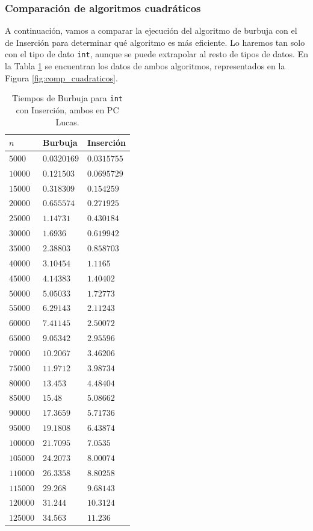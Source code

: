 \documentclass[12pt]{article}
\begin{document}
    \subsubsection{Comparación de algoritmos cuadráticos}
    A continuación, vamos a comparar la ejecución del algoritmo de burbuja con el de Inserción para determinar qué algoritmo es más eficiente. Lo haremos tan solo con el tipo de dato \verb|int|, aunque se puede extrapolar al resto de tipos de datos. En la Tabla \ref{tab:comp_cuadraticos} se encuentran los datos de ambos algoritmos, representados en la Figura \ref{fig:comp_cuadraticos}.
    \begin{table}
        \centering
        \begin{tabular}{|l|l|l|}
            \hline
            $n$ & Burbuja & Inserción \\
            \hline
            $5000$ & $0.0320169$ & $0.0315755$ \\
            $10000$ & $0.121503$ & $0.0695729$ \\
            $15000$ & $0.318309$ & $0.154259$ \\
            $20000$ & $0.655574$ & $0.271925$ \\
            $25000$ & $1.14731$ & $0.430184$ \\
            $30000$ & $1.6936$ & $0.619942$ \\
            $35000$ & $2.38803$ & $0.858703$ \\
            $40000$ & $3.10454$ & $1.1165$ \\
            $45000$ & $4.14383$ & $1.40402$ \\
            $50000$ & $5.05033$ & $1.72773$ \\
            $55000$ & $6.29143$ & $2.11243$ \\
            $60000$ & $7.41145$ & $2.50072$ \\
            $65000$ & $9.05342$ & $2.95596$ \\
            $70000$ & $10.2067$ & $3.46206$ \\
            $75000$ & $11.9712$ & $3.98734$ \\
            $80000$ & $13.453$ & $4.48404$ \\
            $85000$ & $15.48$ & $5.08662$ \\
            $90000$ & $17.3659$ & $5.71736$ \\
            $95000$ & $19.1808$ & $6.43874$ \\
            $100000$ & $21.7095$ & $7.0535$ \\
            $105000$ & $24.2073$ & $8.00074$ \\
            $110000$ & $26.3358$ & $8.80258$ \\
            $115000$ & $29.268$ & $9.68143$ \\
            $120000$ & $31.244$ & $10.3124$ \\
            $125000$ & $34.563$ & $11.236$ \\
            \hline
        \end{tabular}
        \cprotect\caption{Tiempos de Burbuja para \verb|int| con Inserción, ambos en PC Lucas.}
        \label{tab:comp_cuadraticos}
    \end{table}
\end{document}
